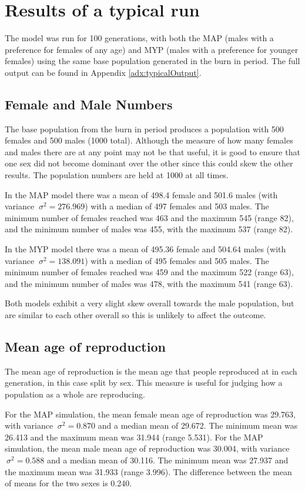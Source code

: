 \documentclass[authoryearcitations]{UoYCSproject}
\begin{document}
\section{Results of a typical run}
The model was run for 100 generations, with both the MAP (males with a preference for females of any age) and MYP (males with a preference for younger females) using the same base population generated in the burn in period. The full output can be found in Appendix \ref{adx:typicalOutput}.

\subsection{Female and Male Numbers}
The base population from the burn in period produces a population with 500 females and 500 males (1000 total). Although the measure of how many females and males there are at any point may not be that useful, it is good to ensure that one sex did not become dominant over the other since this could skew the other results. The population numbers are held at 1000 at all times.

In the MAP model there was a mean of 498.4 female and 501.6 males (with variance $\ \sigma^2 = 276.969 $) with a median of 497 females and 503 males. The minimum number of females reached was 463 and the maximum 545 (range 82), and the minimum number of males was 455, with the maximum 537 (range 82).

In the MYP model there was a mean of 495.36 female and 504.64 males (with variance $\ \sigma^2 = 138.091 $) with a median of 495 females and 505 males. The minimum number of females reached was 459 and the maximum 522 (range 63), and the minimum number of males was 478, with the maximum 541 (range 63).

Both models exhibit a very slight skew overall towards the male population, but are similar to each other overall so this is unlikely to affect the outcome.

\subsection{Mean age of reproduction}
The mean age of reproduction is the mean age that people reproduced at in each generation, in this case split by sex. This measure is useful for judging how a population as a whole are reproducing.

For the MAP simulation, the mean female mean age of reproduction was 29.763, with variance $\ \sigma^2 = 0.870 $ and a median mean of 29.672. The minimum mean was 26.413 and the maximum mean was 31.944 (range 5.531). For the MAP simulation, the mean male mean age of reproduction was 30.004, with variance $\ \sigma^2 = 0.588 $ and a median mean of 30.116. The minimum mean was 27.937 and the maximum mean was 31.933 (range 3.996). The difference between the mean of means for the two sexes is 0.240.
\end{document}
